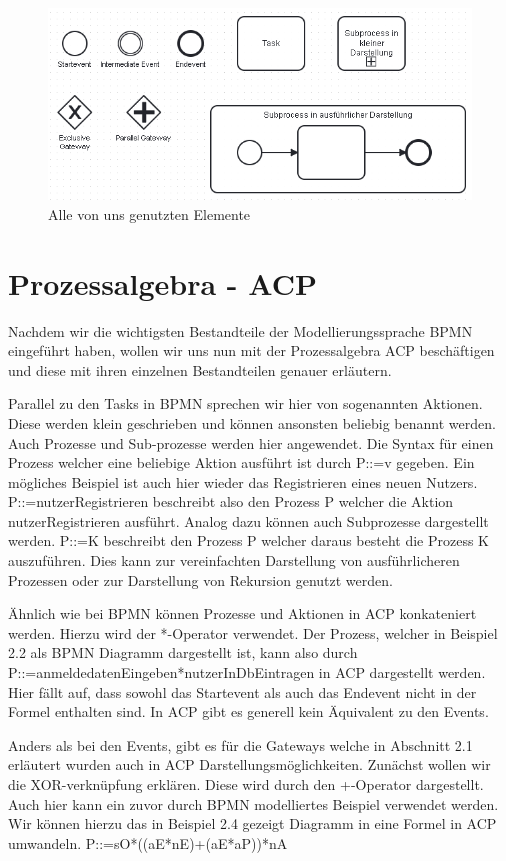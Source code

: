 \begin{figure}
\centering
\includegraphics[scale=0.5]{Figures/Alleblocke}
\decoRule
\caption[Alle Elemente]{Alle von uns genutzten Elemente}
\label{fig:Task}
\end{figure}


\section {Prozessalgebra - ACP}
Nachdem wir die wichtigsten Bestandteile der Modellierungssprache BPMN eingeführt haben, wollen wir uns nun mit der Prozessalgebra ACP beschäftigen und diese mit ihren einzelnen Bestandteilen genauer erläutern.

Parallel zu den Tasks in BPMN sprechen wir hier von sogenannten Aktionen. Diese werden klein geschrieben und können ansonsten beliebig benannt werden. Auch Prozesse und Sub-prozesse werden hier angewendet. Die Syntax für einen Prozess welcher eine beliebige Aktion ausführt ist durch P::=v gegeben. Ein mögliches Beispiel ist auch hier wieder das Registrieren eines neuen Nutzers. P::=nutzerRegistrieren beschreibt also den Prozess P welcher die Aktion nutzerRegistrieren ausführt. Analog dazu können auch Subprozesse dargestellt werden. P::=K beschreibt den Prozess P welcher daraus besteht die Prozess K auszuführen. Dies kann zur vereinfachten Darstellung von ausführlicheren Prozessen oder zur Darstellung von Rekursion genutzt werden.

Ähnlich wie bei BPMN können Prozesse und Aktionen in ACP konkateniert werden. Hierzu wird der *-Operator verwendet. Der Prozess, welcher in Beispiel 2.2 als BPMN Diagramm dargestellt ist, kann also durch P::=anmeldedatenEingeben*nutzerInDbEintragen in ACP dargestellt werden. Hier fällt auf, dass sowohl das Startevent als auch das Endevent nicht in der Formel enthalten sind. In ACP gibt es generell kein Äquivalent zu den Events.

Anders als bei den Events, gibt es für die Gateways welche in Abschnitt 2.1 erläutert wurden auch in ACP Darstellungsmöglichkeiten. Zunächst wollen wir die XOR-verknüpfung erklären. Diese wird durch den +-Operator dargestellt. Auch hier kann ein zuvor durch BPMN modelliertes Beispiel verwendet werden. Wir können hierzu das in Beispiel 2.4 gezeigt Diagramm in eine Formel in ACP umwandeln. P::=sO*((aE*nE)+(aE*aP))*nA

